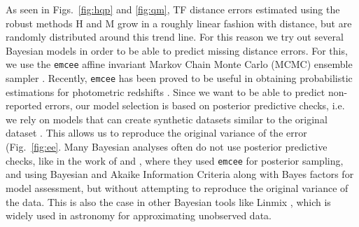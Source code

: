 \documentclass[a4paper,fleqn,usenatbib]{mnras}
\begin{document}
As seen in Figs.~\ref{fig:hqp} and \ref{fig:qm}, TF distance errors estimated using the robust methods H and M grow in a roughly linear fashion with distance, but are randomly distributed around this trend line. For this reason we try out several Bayesian models in order to be able to predict missing distance errors. For this, we use the \texttt{emcee} affine invariant Markov Chain Monte Carlo (MCMC) ensemble sampler \citep{emcee}. Recently, \texttt{emcee} has been proved to be useful in obtaining probabilistic estimations for photometric redshifts \citet{photred1,photred2}. Since we want to be able to predict non-reported errors, our model selection is based on posterior predictive checks, i.e. we rely on models that can create synthetic datasets similar to the original dataset \citep{gelmanppd}. This allows us to reproduce the original variance of the error (Fig.~\ref{fig:ee}. Many Bayesian analyses often do not use posterior predictive checks, like in the work of \citet{propprob2018} and \citet{bayesh}, where they used \texttt{emcee} for posterior sampling, and using Bayesian and Akaike Information Criteria along with Bayes factors for model assessment, but without attempting to reproduce the original variance of the data. This is also the case in other Bayesian tools like Linmix  \citep{gmastro}, which is widely used in astronomy for approximating unobserved data.  \\
\end{document}
